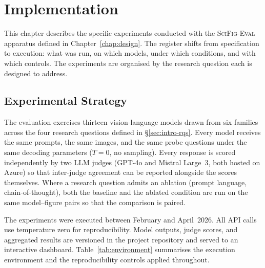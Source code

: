 \chapter{Implementation\label{chap:implementation}}

This chapter describes the specific experiments conducted with
the \textsc{SciFig-Eval} apparatus defined in
Chapter~\ref{chap:design}. The register shifts from specification
to execution: what was run, on which models, under which
conditions, and with which controls. The experiments are organised
by the research question each is designed to address.

\section{Experimental Strategy}
\label{sec:impl-strategy}

The evaluation exercises thirteen vision-language models drawn
from six families across the four research questions defined in
\S\ref{sec:intro-rqs}. Every model receives the same prompts,
the same images, and the same probe questions under the same
decoding parameters ($T{=}0$, no sampling). Every response is
scored independently by two LLM judges (GPT-4o and Mistral
Large~3, both hosted on Azure) so that inter-judge agreement can
be reported alongside the scores themselves. Where a research
question admits an ablation (prompt language, chain-of-thought),
both the baseline and the ablated condition are run on the same
model--figure pairs so that the comparison is paired.

The experiments were executed between February and April~2026. All
API calls use temperature zero for reproducibility. Model
outputs, judge scores, and aggregated results are versioned in
the project repository and served to an interactive dashboard.
Table~\ref{tab:environment} summarises the execution environment
and the reproducibility controls applied throughout.

